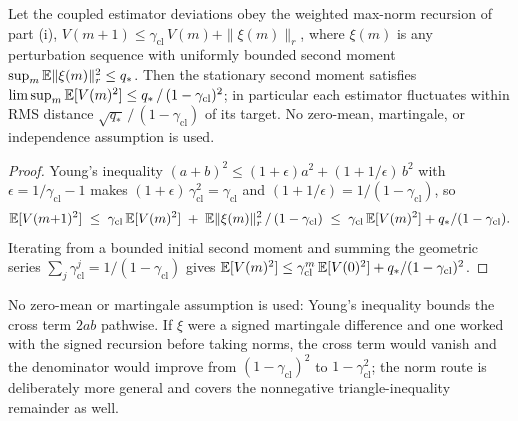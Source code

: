 \begin{proposition}
\label{prop:fluct}
Let the coupled estimator deviations obey the weighted max-norm recursion of part (i), $V(m{+}1) \le \gamma_{\mathrm{cl}}\,V(m) + \|\xi(m)\|_r$, where $\xi(m)$ is any perturbation sequence with uniformly bounded second moment $\sup_m \mathbb{E}\|\xi(m)\|_r^2 \le q_*$.
Then the stationary second moment satisfies $\limsup_m \mathbb{E}[V(m)^2] \le q_*\,/\,(1 - \gamma_{\mathrm{cl}})^2$; in particular each estimator fluctuates within RMS distance $\sqrt{q_*}\,/\,(1 - \gamma_{\mathrm{cl}})$ of its target.
No zero-mean, martingale, or independence assumption is used.
\end{proposition}
\begin{proof}
Young's inequality $(a + b)^2 \le (1 + \epsilon)a^2 + (1 + 1/\epsilon)\,b^2$ with $\epsilon = 1/\gamma_{\mathrm{cl}} - 1$ makes $(1 + \epsilon)\,\gamma_{\mathrm{cl}}^2 = \gamma_{\mathrm{cl}}$ and $(1 + 1/\epsilon) = 1/(1 - \gamma_{\mathrm{cl}})$, so
\[
  \mathbb{E}[V(m{+}1)^2] \;\le\; \gamma_{\mathrm{cl}}\,\mathbb{E}[V(m)^2] \;+\; \mathbb{E}\|\xi(m)\|_r^2\,/\,(1 - \gamma_{\mathrm{cl}}) \;\le\; \gamma_{\mathrm{cl}}\,\mathbb{E}[V(m)^2] + q_*/(1 - \gamma_{\mathrm{cl}}).
\]
Iterating from a bounded initial second moment and summing the geometric series $\sum_j \gamma_{\mathrm{cl}}^j = 1/(1 - \gamma_{\mathrm{cl}})$ gives $\mathbb{E}[V(m)^2] \le \gamma_{\mathrm{cl}}^m\,\mathbb{E}[V(0)^2] + q_*/(1 - \gamma_{\mathrm{cl}})^2$.
\end{proof}
No zero-mean or martingale assumption is used: Young's inequality bounds the cross term $2ab$ pathwise. If $\xi$ were a signed martingale difference and one worked with the signed recursion before taking norms, the cross term would vanish and the denominator would improve from $(1-\gamma_{\mathrm{cl}})^2$ to $1-\gamma_{\mathrm{cl}}^2$; the norm route is deliberately more general and covers the nonnegative triangle-inequality remainder as well.


